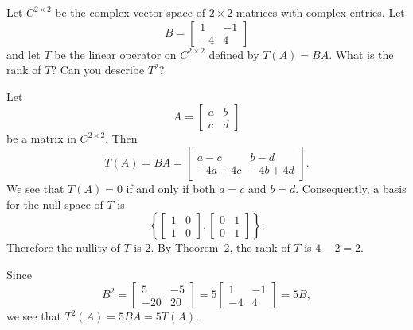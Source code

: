  Let $C^{2\times2}$ be the complex vector space of
$2\times2$ matrices with complex entries. Let
\begin{equation*}
  B =
  \begin{bmatrix}
    1 & -1 \\
    -4 & 4
  \end{bmatrix}
\end{equation*}
and let $T$ be the linear operator on $C^{2\times2}$ defined by
$T(A) = BA$. What is the rank of $T$? Can you describe $T^2$?
\begin{solution}
  Let
  \begin{equation*}
    A =
    \begin{bmatrix}
      a & b \\
      c & d
    \end{bmatrix}
  \end{equation*}
  be a matrix in $C^{2\times2}$. Then
  \begin{equation*}
    T(A) = BA =
    \begin{bmatrix}
      a - c & b - d \\
      -4a + 4c & -4b + 4d
    \end{bmatrix}.
  \end{equation*}
  We see that $T(A) = 0$ if and only if both $a = c$ and $b =
  d$. Consequently, a basis for the null space of $T$ is
  \begin{equation*}
    \left\{
      \begin{bmatrix}
        1 & 0 \\
        1 & 0
      \end{bmatrix},
      \begin{bmatrix}
        0 & 1 \\
        0 & 1
      \end{bmatrix}
    \right\}.
  \end{equation*}
  Therefore the nullity of $T$ is $2$. By Theorem~2, the rank of $T$
  is $4 - 2 = 2$.

  Since
  \begin{equation*}
    B^2 =
    \begin{bmatrix}
      5 & -5 \\
      -20 & 20
    \end{bmatrix}
    = 5
    \begin{bmatrix}
      1 & -1 \\
      -4 & 4
    \end{bmatrix}
    = 5B,
  \end{equation*}
  we see that $T^2(A) = 5BA = 5T(A)$.
\end{solution}


